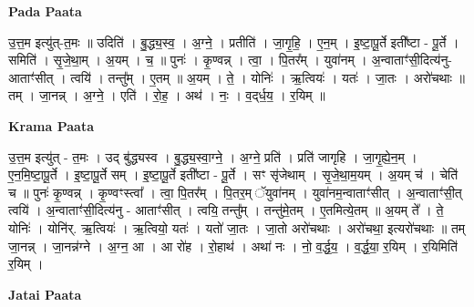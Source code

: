\documentclass[17pt]{extarticle}
\begin{document}
\textbf{Pada Paata} \newline

उ॒त्त॒म इत्यु॑त्-त॒मः ॥ उदिति॑ । बु॒द्ध्य॒स्व॒ । अ॒ग्ने॒ । प्रतीति॑ । जा॒गृ॒हि॒ । ए॒न॒म् । इ॒ष्टा॒पू॒र्ते इती᳚ष्टा - पू॒र्ते । समिति॑ । सृ॒जे॒था॒म् । अ॒यम् । च॒ ॥ पुनः॑ । कृ॒ण्वन्न् । त्वा॒ । पि॒तर᳚म् । युवा॑नम् । अ॒न्वाताꣳ॑सी॒दित्य॑नु-आताꣳ॑सीत् । त्वयि॑ । तन्तु᳚म् । ए॒तम् ॥ अ॒यम् । ते॒ । योनिः॑ । ऋ॒त्वियः॑ । यतः॑ । जा॒तः । अरो॑चथाः ॥ तम् । जा॒नन्न् । अ॒ग्ने॒ । एति॑ । रो॒ह॒ । अथ॑ । नः॒ । व॒द्‌र्ध॒य॒ । र॒यिम् ॥  \newline


\textbf{Krama Paata} \newline

उ॒त्त॒म इत्यु॑त् - त॒मः । उद् बु॑द्ध्यस्व । बु॒द्ध्य॒स्वा॒ग्ने॒ । अ॒ग्ने॒ प्रति॑ । प्रति॑ जागृहि । जा॒गृ॒ह्ये॒न॒म् । ए॒न॒मि॒ष्टा॒पू॒र्ते । इ॒ष्टा॒पू॒र्ते सम् । इ॒ष्टा॒पू॒र्ते इती᳚ष्टा - पू॒र्ते । सꣳ सृ॑जेथाम् । सृ॒जे॒था॒म॒यम् । अ॒यम् च॑ । चेति॑ च ॥ पुनः॑ कृ॒ण्वन्न् । कृ॒ण्वꣳस्त्वा᳚ । त्वा॒ पि॒तर᳚म् । पि॒तर॒म् ॅयुवा॑नम् । युवा॑नम॒न्वाताꣳ॑सीत् । अ॒न्वाताꣳ॑सी॒त् त्वयि॑ । अ॒न्वाताꣳ॑सी॒दित्य॑नु - आताꣳ॑सीत् । त्वयि॒ तन्तु᳚म् । तन्तु॑मे॒तम् । ए॒तमित्ये॒तम् ॥ अ॒यम् ते᳚ । ते॒ योनिः॑ । योनि॑र्. ऋ॒त्वियः॑ । ऋ॒त्वियो॒ यतः॑ । यतो॑ जा॒तः । जा॒तो अरो॑चथाः । अरो॑चथा॒ इत्यरो॑चथाः ॥ तम् जा॒नन्न् । जा॒नन्न॑ग्ने । अ॒ग्न॒ आ । आ रो॑ह । रो॒हाथ॑ । अथा॑ नः । नो॒ व॒र्द्ध॒य॒ । व॒र्द्ध॒या॒ र॒यिम् । र॒यिमिति॑ र॒यिम् । \newline

\textbf{Jatai Paata} \newline
\end{document}

